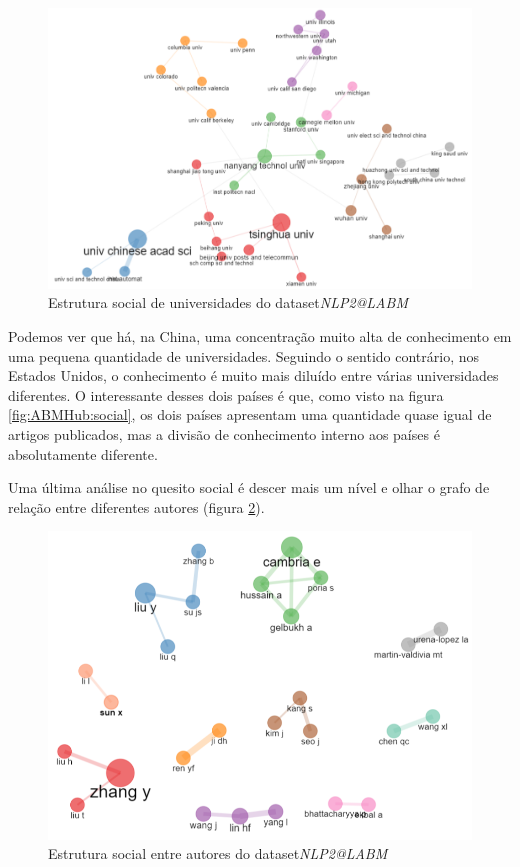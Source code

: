 \begin{figure}
    \centering
    \includegraphics[width=1\textwidth]{experiments/ABMHub/PesquisaBibliometrica/NLP/socialStructure2.png}
    \caption{Estrutura social de universidades do dataset\textit{NLP2@LABM}}
    \label{fig:ABMHub:social2}
\end{figure}

Podemos ver que há, na China, uma concentração muito alta de conhecimento em uma pequena quantidade de universidades. Seguindo o sentido contrário, nos Estados Unidos, o conhecimento é muito mais diluído entre várias universidades diferentes. O interessante desses dois países é que, como visto na figura \ref{fig:ABMHub:social}, os dois países apresentam uma quantidade quase igual de artigos publicados, mas a divisão de conhecimento interno aos países é absolutamente diferente.

Uma última análise no quesito social é descer mais um nível e olhar o grafo de relação entre diferentes autores (figura \ref{fig:ABMHub:social3}).

\begin{figure}
    \centering
    \includegraphics[width=1\textwidth]{experiments/ABMHub/PesquisaBibliometrica/NLP/socialStructure3.png}
    \caption{Estrutura social entre autores do dataset\textit{NLP2@LABM}}
    \label{fig:ABMHub:social3}
\end{figure}

